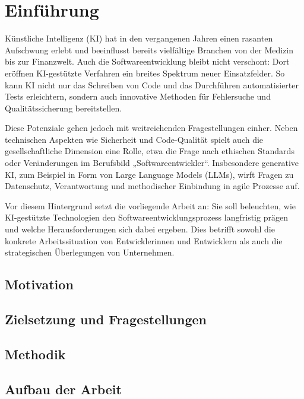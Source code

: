 \chapter{Einführung}
Künstliche Intelligenz (KI) hat in den vergangenen Jahren einen rasanten Aufschwung erlebt und beeinflusst bereits vielfältige Branchen von der Medizin bis zur Finanzwelt. Auch die Softwareentwicklung bleibt nicht verschont: Dort eröffnen KI-gestützte Verfahren ein breites Spektrum neuer Einsatzfelder. So kann KI nicht nur das Schreiben von Code und das Durchführen automatisierter Tests erleichtern, sondern auch innovative Methoden für Fehlersuche und Qualitätssicherung bereitstellen.

Diese Potenziale gehen jedoch mit weitreichenden Fragestellungen einher. Neben technischen Aspekten wie Sicherheit und Code-Qualität spielt auch die gesellschaftliche Dimension eine Rolle, etwa die Frage nach ethischen Standards oder Veränderungen im Berufsbild „Softwareentwickler“. Insbesondere generative KI, zum Beispiel in Form von Large Language Models (LLMs), wirft Fragen zu Datenschutz, Verantwortung und methodischer Einbindung in agile Prozesse auf.

Vor diesem Hintergrund setzt die vorliegende Arbeit an: Sie soll beleuchten, wie KI-gestützte Technologien den Softwareentwicklungsprozess langfristig prägen und welche Herausforderungen sich dabei ergeben. Dies betrifft sowohl die konkrete Arbeitssituation von Entwicklerinnen und Entwicklern als auch die strategischen Überlegungen von Unternehmen.

\section{Motivation}


\section{Zielsetzung und Fragestellungen}


\section{Methodik}


\section{Aufbau der Arbeit}


